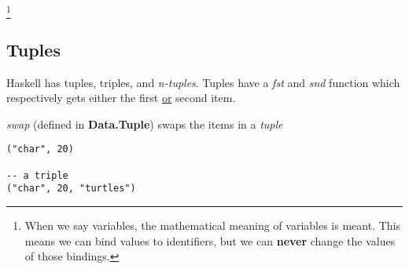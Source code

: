 \footnote{
    When we say variables, the mathematical meaning of variables is meant.
    This means we can bind values to identifiers, but we can \textbf{never} change the values of those bindings.
}

\subsection{Tuples}
Haskell has tuples, triples, and \emph{n-tuples}. Tuples have a \emph{fst} and \emph{snd} function which
respectively gets either the first \underline{or} second item. 

\emph{swap} (defined in \textbf{Data.Tuple}) swaps the items in a \emph{tuple}

\begin{lstlisting}
("char", 20)

-- a triple
("char", 20, "turtles")
\end{lstlisting}